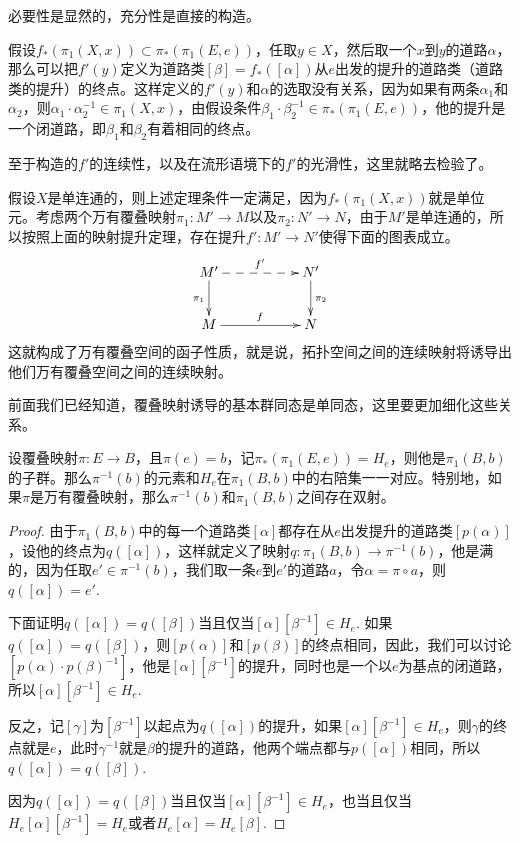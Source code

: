 必要性是显然的，充分性是直接的构造。

假设$f_*(\pi_1(X,x))\subset \pi_*(\pi_1(E,e))$，任取$y\in X$，然后取一个$x$到$y$的道路$\alpha$，那么可以把$f'(y)$定义为道路类$[\beta]=f_*([\alpha])$从$e$出发的提升的道路类（道路类的提升）的终点。这样定义的$f'(y)$和$\alpha$的选取没有关系，因为如果有两条$\alpha_1$和$\alpha_2$，则$\alpha_1\cdot\alpha_2^{-1}\in \pi_1(X,x)$，由假设条件$\beta_1\cdot\beta_2^{-1}\in \pi_*(\pi_1(E,e))$，他的提升是一个闭道路，即$\beta_1$和$\beta_2$有着相同的终点。

至于构造的$f'$的连续性，以及在流形语境下的$f'$的光滑性，这里就略去检验了。

\para 假设$X$是单连通的，则上述定理条件一定满足，因为$f_*(\pi_1(X,x))$就是单位元。考虑两个万有覆叠映射$\pi_1:M'\to M$以及$\pi_2:N'\to N$，由于$M'$是单连通的，所以按照上面的映射提升定理，存在提升$f':M'\to N'$使得下面的图表成立。
\[
\xymatrix{
	M'\ar@{-->}[rr]^{f'} \ar[d]_{\pi_1}&&N' \ar[d]^{\pi_2}\\
	M\ar[rr]^{f}&& N
}
\]
这就构成了万有覆叠空间的函子性质，就是说，拓扑空间之间的连续映射将诱导出他们万有覆叠空间之间的连续映射。

前面我们已经知道，覆叠映射诱导的基本群同态是单同态，这里要更加细化这些关系。

\begin{pro}
设覆叠映射$\pi:E\to B$，且$\pi(e)=b$，记$\pi_*(\pi_1(E,e))=H_e$，则他是$\pi_1(B,b)$的子群。那么$\pi^{-1}(b)$的元素和$H_e$在$\pi_1(B,b)$中的右陪集一一对应。特别地，如果$\pi$是万有覆叠映射，那么$\pi^{-1}(b)$和$\pi_1(B,b)$之间存在双射。
\end{pro}

\begin{proof}
由于$\pi_1(B,b)$中的每一个道路类$[\alpha]$都存在从$e$出发提升的道路类$[p(\alpha)]$，设他的终点为$q([\alpha])$，这样就定义了映射$q:\pi_1(B,b)\to \pi^{-1}(b)$，他是满的，因为任取$e'\in \pi^{-1}(b)$，我们取一条$e$到$e'$的道路$a$，令$\alpha=\pi\circ a$，则$q([\alpha])=e'$.

下面证明$q([\alpha])=q([\beta])$当且仅当$[\alpha][\beta^{-1}]\in H_e$. 如果$q([\alpha])=q([\beta])$，则$[p(\alpha)]$和$[p(\beta)]$的终点相同，因此，我们可以讨论$[p(\alpha)\cdot p(\beta)^{-1}]$，他是$[\alpha][\beta^{-1}]$的提升，同时也是一个以$e$为基点的闭道路，所以$[\alpha][\beta^{-1}]\in H_e$.

反之，记$[\gamma]$为$[\beta^{-1}]$以起点为$q([\alpha])$的提升，如果$[\alpha][\beta^{-1}]\in H_e$，则$\gamma$的终点就是$e$，此时$\gamma^{-1}$就是$\beta$的提升的道路，他两个端点都与$p([\alpha])$相同，所以$q([\alpha])=q([\beta])$.

因为$q([\alpha])=q([\beta])$当且仅当$[\alpha][\beta^{-1}]\in H_e$，也当且仅当$H_e[\alpha][\beta^{-1}]=H_e$或者$H_e[\alpha]=H_e[\beta]$.
\end{proof}

